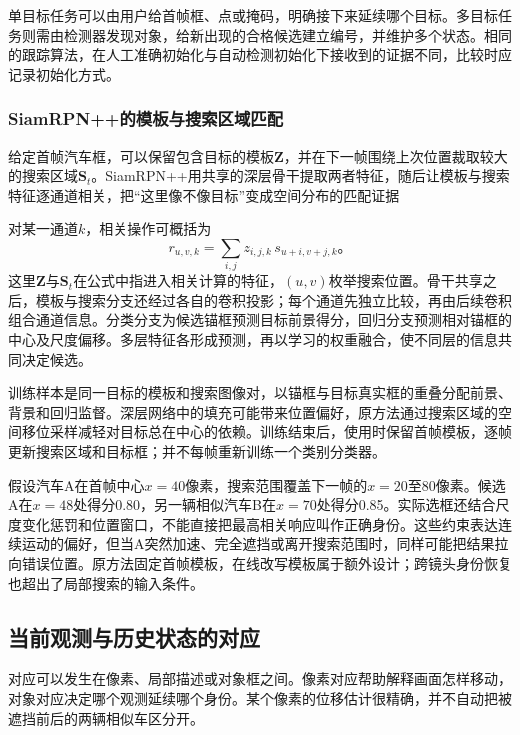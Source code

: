 单目标任务可以由用户给首帧框、点或掩码，明确接下来延续哪个目标。多目标任务则需由检测器发现对象，给新出现的合格候选建立编号，并维护多个状态。相同的跟踪算法，在人工准确初始化与自动检测初始化下接收到的证据不同，比较时应记录初始化方式。

\subsubsection{SiamRPN++的模板与搜索区域匹配}
\label{sec:vision-video-siamrpn}

给定首帧汽车框，可以保留包含目标的模板$\bm{Z}$，并在下一帧围绕上次位置裁取较大的搜索区域$\bm{S}_t$。SiamRPN++用共享的深层骨干提取两者特征，随后让模板与搜索特征逐通道相关，把“这里像不像目标”变成空间分布的匹配证据

对某一通道$k$，相关操作可概括为
\begin{equation}
  r_{u,v,k}=\sum_{i,j}z_{i,j,k}\,s_{u+i,v+j,k}\text{。}
  \label{eq:vision-video-depthwise-correlation}
\end{equation}
这里$\bm{Z}$与$\bm{S}_t$在公式中指进入相关计算的特征，$(u,v)$枚举搜索位置。骨干共享之后，模板与搜索分支还经过各自的卷积投影；每个通道先独立比较，再由后续卷积组合通道信息。分类分支为候选锚框预测目标前景得分，回归分支预测相对锚框的中心及尺度偏移。多层特征各形成预测，再以学习的权重融合，使不同层的信息共同决定候选。

训练样本是同一目标的模板和搜索图像对，以锚框与目标真实框的重叠分配前景、背景和回归监督。深层网络中的填充可能带来位置偏好，原方法通过搜索区域的空间移位采样减轻对目标总在中心的依赖。训练结束后，使用时保留首帧模板，逐帧更新搜索区域和目标框；并不每帧重新训练一个类别分类器。

假设汽车A在首帧中心$x=40$像素，搜索范围覆盖下一帧的$x=20$至80像素。候选A在$x=48$处得分0.80，另一辆相似汽车B在$x=70$处得分0.85。实际选框还结合尺度变化惩罚和位置窗口，不能直接把最高相关响应叫作正确身份。这些约束表达连续运动的偏好，但当A突然加速、完全遮挡或离开搜索范围时，同样可能把结果拉向错误位置。原方法固定首帧模板，在线改写模板属于额外设计；跨镜头身份恢复也超出了局部搜索的输入条件。

\subsection{当前观测与历史状态的对应}
\label{sec:vision-video-correspondence}

对应可以发生在像素、局部描述或对象框之间。像素对应帮助解释画面怎样移动，对象对应决定哪个观测延续哪个身份。某个像素的位移估计很精确，并不自动把被遮挡前后的两辆相似车区分开。


